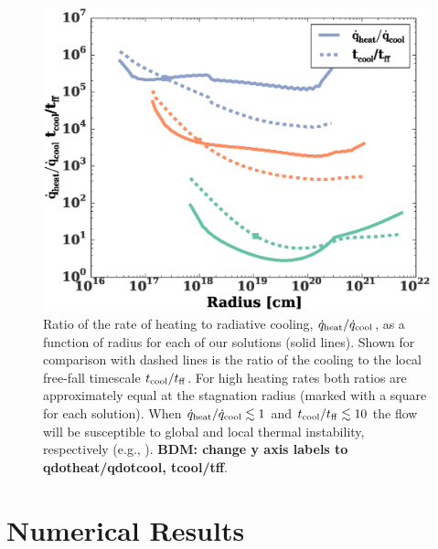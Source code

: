 \documentclass[usenatbib,fleqn]{mn2e}
\newcommand\lsim{\mathrel{\rlap{\lower4pt\hbox{\hskip1pt$\sim$}}
    \raise1pt\hbox{$<$}}}
\newcommand\gsim{\mathrel{\rlap{\lower4pt\hbox{\hskip1pt$\sim$}}
    \raise1pt\hbox{$>$}}}
\begin{document}

\begin{figure}
  \includegraphics[width=\columnwidth]{cooling.eps}
  \caption{\label{fig:cooling} Ratio of the rate of heating to radiative cooling, $\dot{q}_{\rm heat}/\dot{q}_{\rm cool}$, as a function of radius for each of our solutions (solid lines).  Shown for comparison with dashed lines is the ratio of the cooling to the local free-fall timescale $t_{\rm cool}/t_{\rm ff}$.  For high heating rates both ratios are approximately equal at the stagnation radius (marked with a square for each solution).  When $\dot{q}_{\rm heat}/\dot{q}_{\rm cool} \lesssim 1$ and $t_{\rm cool}/t_{\rm ff} \lesssim 10$ the flow will be susceptible to global and local thermal instability, respectively (e.g.,  \citealt{McCourt+12}).  {\bf BDM: change y axis labels to qdotheat/qdotcool, tcool/tff}.}
\end{figure}


%


\section{Numerical Results}
\label{sec:numerical}
\end{document}
